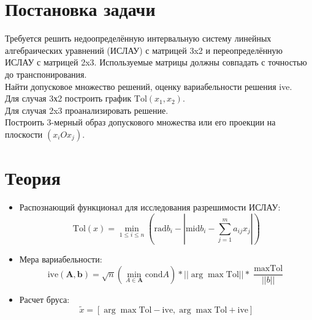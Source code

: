 
\usepackage{amsmath}

\lstset{language=Java} 




\renewcommand\contentsname{\centerline{Содержание}}
\tableofcontents
\newpage

\listoffigures
\newpage


\section{Постановка задачи}

Требуется решить недоопределённую интервальную систему линейных алгебраических уравнений (ИСЛАУ) с матрицей 3x2 и переопределённую ИСЛАУ с матрицей 2x3. Используемые матрицы должны совпадать с точностью до транспонирования. \\
Найти допусковое множество решений, оценку вариабельности решения ive. \\
Для случая 3х2 построить график $\text{Tol}(x_1, x_2)$. \\
Для случая 2x3 проанализировать решение. \\
Построить 3-мерный образ допускового множества или его проекции на плоскости $(x_i O x_j)$.



\section{Теория}

\begin{itemize}

	\item Распознающий функционал для исследования разрешимости ИСЛАУ:
		\begin{equation}
			\text{Tol}(x)=\min_{1 \leq i \leq n} (\text{rad} b_i - |\text{mid} b_i - \sum_{j=1}^{m}a_{ij}x_j|)
		\end{equation}
	
	\item Мера вариабельности:
		\begin{equation}
			\text{ive}(\textbf{A}, \textbf{b})= \sqrt{n} (\min_{A \in \textbf{A}} \text{cond} A) * ||\arg \max \text{Tol} || * \frac{\max \text{Tol}}{||b||}
		\end{equation}
	
	\item Расчет бруса:
		\begin{equation}
			\tilde{x} = [ \arg \max \text{Tol} - \text{ive}, \arg \max \text{Tol} + \text{ive} ]
		\end{equation}

\end{itemize}



